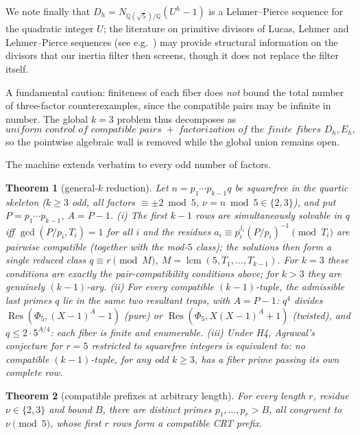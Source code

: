 \documentclass[11pt]{amsart}
\newtheorem{theorem}{Theorem}[section]
\theoremstyle{definition}
\theoremstyle{remark}
\newcommand{\Q}{\mathbb{Q}}
\newcommand{\lcm}{\operatorname{lcm}}
\newcommand{\Res}{\operatorname{Res}}
\begin{document}
We note finally that $D_h = N_{\Q(\sqrt5)/\Q}(U^h - 1)$ is a
Lehmer--Pierce sequence for the quadratic integer $U$; the literature on
primitive divisors of Lucas, Lehmer and Lehmer--Pierce sequences
(see e.g.\ \cite{Voutier1996,BHV2001,Flatters}) may
provide structural information on the divisors that our inertia filter
then screens, though it does not replace the filter itself.

A fundamental caution: finiteness of each fiber does \emph{not} bound the
total number of three-factor counterexamples, since the compatible pairs
may be infinite in number. The global $k = 3$ problem thus decomposes as
\[
\textit{uniform control of compatible pairs}
\;+\;
\textit{factorization of the finite fibers } D_h, E_h,
\]
so the pointwise algebraic wall is removed while the global union remains
open.

The machine extends verbatim to every odd number of factors.

\begin{theorem}[general-$k$ reduction]\label{thm:generalk}
Let $n = p_1 \cdots p_{k-1} q$ be squarefree in the quartic skeleton
($k \ge 3$ odd, all factors $\equiv \pm2 \bmod 5$, $\nu = n \bmod 5 \in
\{2,3\}$), and put $P = p_1\cdots p_{k-1}$, $A = P - 1$.
\emph{(i)} The first $k-1$ rows are simultaneously solvable in $q$ iff
$\gcd(P/p_i, T_i) = 1$ for all $i$ and the residues
$a_i \equiv p_i^{j_i}(P/p_i)^{-1} \pmod{T_i}$ are pairwise compatible
(together with the mod-$5$ class); the solutions then form a single
reduced class $q \equiv r \pmod{M}$, $M = \lcm(5, T_1, \dots, T_{k-1})$.
For $k = 3$ these conditions are exactly the pair-compatibility
conditions above; for $k > 3$ they are genuinely $(k-1)$-ary.
\emph{(ii)} For every compatible $(k-1)$-tuple, the admissible last
primes $q$ lie in the same two resultant traps, with $A = P-1$:
$q^4$ divides $\Res(\Phi_5, (X-1)^A - 1)$ (pure) or
$\Res(\Phi_5, X(X-1)^A + 1)$ (twisted), and $q \le 2\cdot5^{A/4}$: each
fiber is finite and enumerable.
\emph{(iii)} Under H4, Agrawal's conjecture for $r = 5$ restricted to
squarefree integers is \emph{equivalent} to: no compatible
$(k-1)$-tuple, for any odd $k \ge 3$, has a fiber prime passing its own
complete row.
\end{theorem}

\begin{theorem}[compatible prefixes at arbitrary length]
\label{thm:prefixes}
For every length \(r\), residue \(\nu\in\{2,3\}\) and bound \(B\), there
are distinct primes \(p_1,\ldots,p_r>B\), all congruent to \(\nu\pmod5\),
whose first \(r\) rows form a compatible CRT prefix.
\end{theorem}
\end{document}
